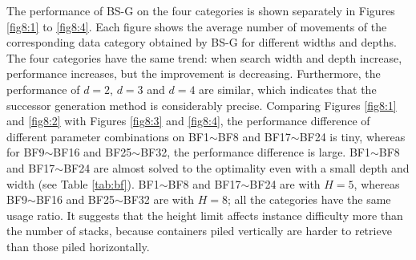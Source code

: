 \documentclass[review,3p,times,authoryear,12pt]{elsarticle}
\begin{document}
The performance of BS-G on the four categories is shown separately in Figures \ref{fig8:1} to \ref{fig8:4}. 
Each figure shows the average number of movements of the corresponding data category obtained by BS-G for different widths and depths. 
The four categories have the same trend: when search width and depth increase, performance increases, but the improvement is decreasing. Furthermore, the performance of $d=2$, $d=3$ and $d=4$ are similar, which indicates that the successor generation method is considerably precise. 
Comparing Figures \ref{fig8:1} and \ref{fig8:2} with Figures \ref{fig8:3} and \ref{fig8:4}, the performance difference of different parameter combinations on BF1$\sim$BF8 and BF17$\sim$BF24 is tiny, whereas for BF9$\sim$BF16 and BF25$\sim$BF32, the performance difference is large. 
BF1$\sim$BF8 and BF17$\sim$BF24 are almost solved to the optimality even with a small depth and width (see Table \ref{tab:bf}). 
BF1$\sim$BF8 and BF17$\sim$BF24 are with $H=5$, whereas BF9$\sim$BF16 and BF25$\sim$BF32 are with $H=8$; all the categories have the same usage ratio. 
It suggests that the height limit affects instance difficulty more than the number of stacks, because containers piled vertically are harder to retrieve than those piled horizontally. 
\end{document}
